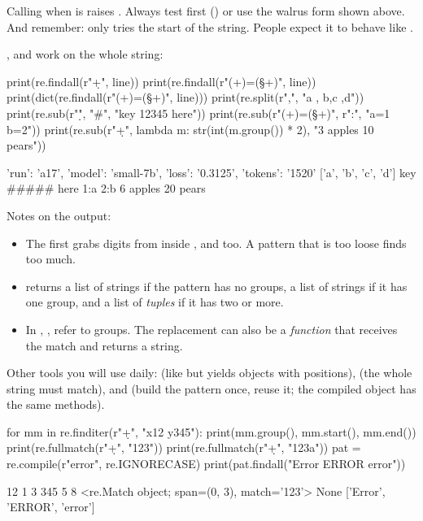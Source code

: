 \begin{trap}
Calling  when  is  raises . Always test
first () or use the walrus form shown above. And remember:  only
tries the start of the string. People expect it to behave like .
\end{trap}

,  and  work on the whole string:

\begin{pycode}
print(re.findall(r"\d+", line))
print(re.findall(r"(\w+)=(\S+)", line))
print(dict(re.findall(r"(\w+)=(\S+)", line)))
print(re.split(r"\s*,\s*", "a , b,c ,d"))
print(re.sub(r"\d", "#", "key 12345 here"))
print(re.sub(r"(\w+)=(\S+)", r"\2:\1", "a=1 b=2"))
print(re.sub(r"\d+", lambda m: str(int(m.group()) * 2), "3 apples 10 pears"))
\end{pycode}
\begin{rawcode}
{'run': 'a17', 'model': 'small-7b', 'loss': '0.3125', 'tokens': '1520'}
['a', 'b', 'c', 'd']
key ##### here
1:a 2:b
6 apples 20 pears
\end{rawcode}

Notes on the output:
\begin{itemize}[nosep]
  \item The first  grabs digits from inside ,  and
         too. A pattern that is too loose finds too much.
  \item {} returns a list of strings if the pattern has no groups, a list of strings
        if it has one group, and a list of \emph{tuples} if it has two or more.
  \item In , ,  refer to groups. The
        replacement can also be a \emph{function} that receives the match and returns a string.
\end{itemize}

Other tools you will use daily:  (like  but yields
 objects with positions),  (the whole string must match), and
 (build the pattern once, reuse it; the compiled object has the same methods).

\begin{pycode}
for mm in re.finditer(r"\d+", "x12 y345"):
    print(mm.group(), mm.start(), mm.end())
print(re.fullmatch(r"\d+", "123"))
print(re.fullmatch(r"\d+", "123a"))
pat = re.compile(r"error", re.IGNORECASE)
print(pat.findall("Error ERROR error"))
\end{pycode}
\begin{rawcode}
12 1 3
345 5 8
<re.Match object; span=(0, 3), match='123'>
None
['Error', 'ERROR', 'error']
\end{rawcode}

